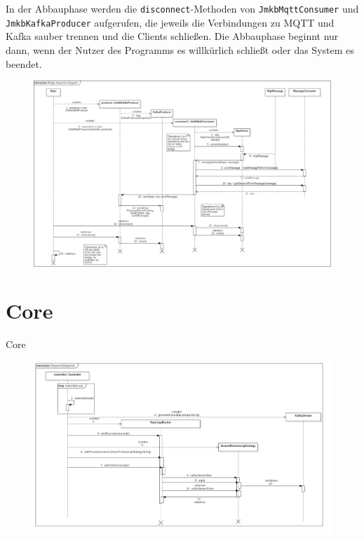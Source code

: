 In der Abbauphase werden die \texttt{disconnect}-Methoden von \texttt{JmkbMqttConsumer} und \texttt{JmkbKafkaProducer} aufgerufen, die jeweils die Verbindungen zu MQTT und Kafka sauber trennen und die Clients schließen. Die Abbauphase beginnt nur dann, wenn der Nutzer des Programms es willkürlich schließt oder das System es beendet.
\begin{figure}[!hbp]
	\centering
	\includegraphics[width=\textheight,angle=90]{images/bridge/BridgeSequenceDiagram.png}
\end{figure}
\newpage

\section{Core}
Core
\begin{figure}[!hbp]
	\centering
	\includegraphics[width=\linewidth]{images/core/CoreSequenceDiagram.png}
\end{figure}
\newpage

